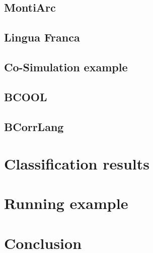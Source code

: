 \documentclass[runningheads]{llncs}
\begin{document}
\subsection{MontiArc} %
\subsection{Lingua Franca} %
\subsection{Co-Simulation example} %
\subsection{BCOOL} %
\subsection{BCorrLang} %

\section{Classification results}




\section{Running example}



\section{Conclusion} \label{sec:conclusion}



\end{document}
